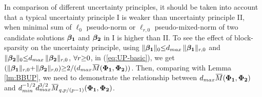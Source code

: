 

In comparison of different uncertainty principles, it should be taken into account that a typical uncertainty principle I is weaker than uncertainty principle II, when minimal sum of $\ell_0$ pseudo-norm or $\ell_{r,0}$ pseudo-mixed-norm of two candidate solutions $\boldsymbol{\beta_1}$ and $\boldsymbol{\beta_2}$ in I is higher than II.
To see the effect of block-sparsity on the uncertainty principle, using $\Vert \boldsymbol{\beta_1} \Vert_{0} {\leq} d_{max} \, \Vert \boldsymbol{\beta_1} \Vert_{r,0}$ and $\Vert \boldsymbol{\beta_2} \Vert_{0} {\leq} d_{max} \, \Vert \boldsymbol{\beta_2} \Vert_{r,0}$, $\forall r {\geq} 0$, in (\ref{eq:UP-basic}), we get $(\Vert \mybetao \Vert_{r,0} \spl \Vert \mybetaTwo \Vert_{r,0}) \sgeq 2/(d_{max} \overbar{M} (\myPhiOne,\myPhiTwo))$.
Then, comparing with Lemma \ref{lm:BBUP}, we need to demonstrate the relationship between $d_{max} \overbar{M}(\myPhiOne,\myPhiTwo)$ and $d_{min}^{-1/2} d_{max}^{3/2} \overbar{M}_{q,p/(p-1)} (\myPhiOne , \myPhiTwo)$.   






